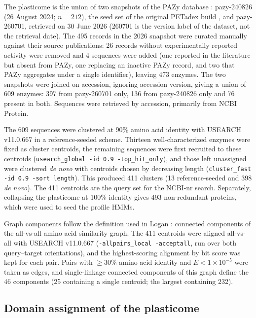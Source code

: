 \documentclass[pdflatex,sn-nature,iicol]{sn-jnl}%
\begin{document}
The plasticome is the union of two snapshots of the PAZy database \citep{buchholz2022pazy}: pazy-240826 (26 August 2024; $n=212$), the seed set of the original PETadex build \citep{petadexweb}, and pazy-260701, retrieved on 30 June 2026 (260701 is the version label of the dataset, not the retrieval date). The 495 records in the 2026 snapshot were curated manually against their source publications: 26 records without experimentally reported activity were removed and 4 sequences were added (one reported in the literature but absent from PAZy, one replacing an inactive PAZy record, and two that PAZy aggregates under a single identifier), leaving 473 enzymes. The two snapshots were joined on accession, ignoring accession version, giving a union of 609 enzymes: 397 from pazy-260701 only, 136 from pazy-240826 only and 76 present in both. Sequences were retrieved by accession, primarily from NCBI Protein.

The 609 sequences were clustered at 90\% amino acid identity with USEARCH v11.0.667 \citep{edgar2010usearch} in a reference-seeded scheme. Thirteen well-characterized enzymes were fixed as cluster centroids, the remaining sequences were first recruited to these centroids (\texttt{usearch\_global -id 0.9 -top\_hit\_only}), and those left unassigned were clustered \textit{de novo} with centroids chosen by decreasing length (\texttt{cluster\_fast -id 0.9 -sort length}). This produced 411 clusters (13 reference-seeded and 398 \textit{de novo}). The 411 centroids are the query set for the NCBI-nr search. Separately, collapsing the plasticome at 100\% identity gives 493 non-redundant proteins, which were used to seed the profile HMMs.

Graph components follow the definition used in Logan \citep{chikhi2024logan}: connected components of the all-vs-all amino acid similarity graph. The 411 centroids were aligned all-vs-all with USEARCH v11.0.667 (\texttt{-allpairs\_local -acceptall}, run over both query--target orientations), and the highest-scoring alignment by bit score was kept for each pair. Pairs with $\ge$30\% amino acid identity and $E < 1\times10^{-5}$ were taken as edges, and single-linkage connected components of this graph define the 46 components (25 containing a single centroid; the largest containing 232).

\subsection{Domain assignment of the plasticome}
\end{document}
